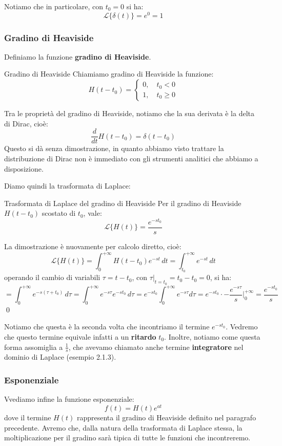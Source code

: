 \documentclass[a4paper,11pt]{article}
\begin{document}
Notiamo che in particolare, con $t_0 = 0$ si ha:
$$
\mathcal{L}\{\delta(t)\} = e^0 = 1
$$

\subsubsection{Gradino di Heaviside}
Definiamo la funzione \textbf{gradino di Heaviside}.
\begin{definition}{Gradino di Heaviside}
	Chiamiamo gradino di Heaviside la funzione:
	$$
	H(t - t_0) = 
	\begin{cases}
		0, \quad t_0 < 0 \\
		1, \quad t_0 \geq 0
	\end{cases}
	$$
\end{definition}

Tra le proprietà del gradino di Heaviside, notiamo che la sua derivata è la delta di Dirac, cioè:
$$
\frac{d}{dt}H(t - t_0) = \delta(t - t_0)
$$
Questo si dà senza dimostrazione, in quanto abbiamo visto trattare la distribuzione di Dirac non è immediato con gli strumenti analitici che abbiamo a disposizione.

Diamo quindi la trasformata di Laplace:
\begin{theorem}{Trasformata di Laplace del gradino di Heaviside}
	Per il gradino di Heaviside $H(t - t_0)$ scostato di $t_0$, vale:
	$$
	\mathcal{L}\{H(t)\} = \frac{e^{-s t_0}}{s}
	$$
\end{theorem}
La dimostrazione è nuovamente per calcolo diretto, cioè:
$$
\mathcal{L}\{H(t)\} = \int_{0}^{+\infty} H(t - t_0) e^{-st} \, dt =\int_{t_0}^{+\infty} e^{-st} \, dt 
$$
operando il cambio di variabili $\tau = t - t_0$, con $\tau |_{t = t_0} = t_0 - t_0 = 0$, si ha:
$$
= \int_0^{+\infty} e^{-s(\tau + t_0)} \, d\tau = \int_0^{+\infty} e^{-s\tau} e^{-s t_0} \, d\tau = e^{-s t_0} \int_0^{+\infty} e^{-s \tau} d\tau = e^{-s t_0} \cdot -\frac{e^{-s \tau}}{s} \Bigg|^{+\infty}_0 = \frac{e^{-s t_0}}{s}
$$
\qed

Notiamo che questa è la seconda volta che incontriamo il termine $e^{-s t_0}$. Vedremo che questo termine equivale infatti a un \textbf{ritardo} $t_0$.
Inoltre, notiamo come questa forma assomiglia a $\frac{1}{s}$, che avevamo chiamato anche termine \textbf{integratore} nel dominio di Laplace (esempio 2.1.3).

\subsubsection{Esponenziale}
Vvediamo infine la funzione esponenziale:
		$$
		f(t) = H(t) e^{at}
		$$
		dove il termine $H(t)$ rappresenta il gradino di Heaviside definito nel paragrafo precedente.
		Avremo che, dalla natura della trasformata di Laplace stessa, la moltiplicazione per il gradino sarà tipica di tutte le funzioni che incontreremo.
\end{document}
